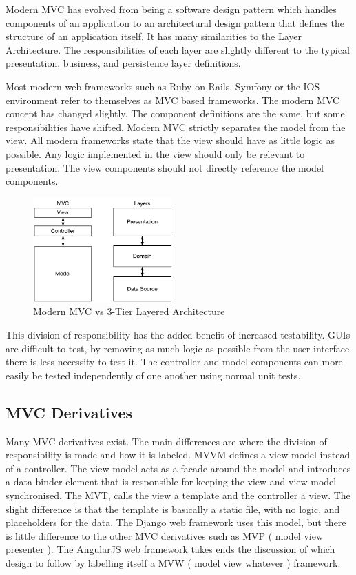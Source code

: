 Modern MVC has evolved from being a software design pattern which handles components of an application to an architectural design pattern that defines the structure of an application itself. It has many similarities to the Layer Architecture. The responsibilities of each layer are slightly different to the typical presentation, business, and persistence layer definitions.

Most modern web frameworks such as Ruby on Rails, Symfony or the IOS environment refer to themselves as MVC based frameworks. The modern MVC concept has changed slightly. The component definitions are the same, but some responsibilities have shifted. Modern MVC strictly separates the model from the view. All modern frameworks state that the view should have as little logic as possible. Any logic implemented in the view should only be relevant to presentation. The view components should not directly reference the model components\cite{apple_MVC}\cite{symfony_MVC}.

\begin{figure}[H]
    \centering
    \includegraphics[height=4cm,keepaspectratio]{assets/concept/mvc_2.pdf}
    \caption{Modern MVC vs 3-Tier Layered Architecture}
    \label{fig:mvc_2}
\end{figure}

This division of responsibility has the added benefit of increased testability. GUIs are difficult to test, by removing as much logic as possible from the user interface there is less necessity to test it. The controller and model components can more easily be tested independently of one another using normal unit tests\cite{mvp_testing}.

\subsection{MVC Derivatives}

Many MVC derivatives exist. The main differences are where the division of responsibility is made and how it is labeled. MVVM defines a view model instead of a controller. The view model acts as a facade around the model and introduces a data binder element that is responsible for keeping the view and view model synchronised. The MVT, calls the view a template and the controller a view. The slight difference is that the template is basically a static file, with no logic, and placeholders for the data. The Django web framework uses this model, but there is little difference to the other MVC derivatives such as MVP ( model view presenter ). The AngularJS web framework takes ends the discussion of which design to follow by labelling itself a MVW ( model view whatever ) framework\cite{mvw}.


